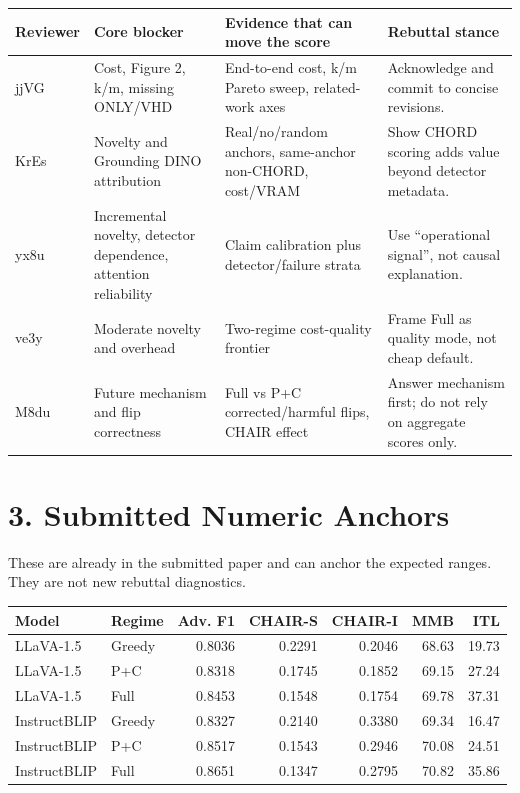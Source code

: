 \documentclass[10pt]{article}
\begin{document}
\begin{tabularx}{\textwidth}{@{}p{}Y Y Y@{}}
\toprule
Reviewer & Core blocker & Evidence that can move the score & Rebuttal stance \\
\midrule
jjVG & Cost, Figure 2, k/m, missing ONLY/VHD & End-to-end cost, k/m Pareto sweep, related-work axes & Acknowledge and commit to concise revisions. \\
KrEs & Novelty and Grounding DINO attribution & Real/no/random anchors, same-anchor non-CHORD, cost/VRAM & Show CHORD scoring adds value beyond detector metadata. \\
yx8u & Incremental novelty, detector dependence, attention reliability & Claim calibration plus detector/failure strata & Use ``operational signal'', not causal explanation. \\
ve3y & Moderate novelty and overhead & Two-regime cost-quality frontier & Frame Full as quality mode, not cheap default. \\
M8du & Future mechanism and flip correctness & Full vs P+C corrected/harmful flips, CHAIR effect & Answer mechanism first; do not rely on aggregate scores only. \\
\bottomrule
\end{tabularx}

\section*{3. Submitted Numeric Anchors}

These are already in the submitted paper and can anchor the expected ranges. They are not new rebuttal diagnostics.

\begin{tabularx}{\textwidth}{@{}l l r r r r r@{}}
\toprule
Model & Regime & Adv. F1 & CHAIR-S & CHAIR-I & MMB & ITL \\
\midrule
LLaVA-1.5 & Greedy & 0.8036 & 0.2291 & 0.2046 & 68.63 & 19.73 \\
LLaVA-1.5 & P+C & 0.8318 & 0.1745 & 0.1852 & 69.15 & 27.24 \\
LLaVA-1.5 & Full & 0.8453 & 0.1548 & 0.1754 & 69.78 & 37.31 \\
InstructBLIP & Greedy & 0.8327 & 0.2140 & 0.3380 & 69.34 & 16.47 \\
InstructBLIP & P+C & 0.8517 & 0.1543 & 0.2946 & 70.08 & 24.51 \\
InstructBLIP & Full & 0.8651 & 0.1347 & 0.2795 & 70.82 & 35.86 \\
\bottomrule
\end{tabularx}
\end{document}
